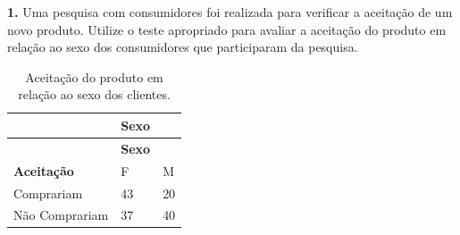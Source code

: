 \documentclass[12pt,brazil,oneside]{book}
\begin{document}
\textbf{1.} Uma pesquisa com consumidores foi realizada para verificar a aceitação de um novo produto. Utilize o teste apropriado para avaliar a aceitação do produto em relação ao sexo dos consumidores que participaram da pesquisa.

\begin{longtable}[]{@{}lll@{}}
\caption{\label{tab:exercqui} Aceitação do produto em relação ao sexo dos clientes.}\tabularnewline
\toprule
\begin{minipage}[b]{0.35\columnwidth}\raggedright
\strut
\end{minipage} & \begin{minipage}[b]{0.25\columnwidth}\raggedright
\textbf{Sexo}\strut
\end{minipage} & \begin{minipage}[b]{0.25\columnwidth}\raggedright
\strut
\end{minipage}\tabularnewline
\midrule
\endfirsthead
\toprule
\begin{minipage}[b]{0.35\columnwidth}\raggedright
\strut
\end{minipage} & \begin{minipage}[b]{0.25\columnwidth}\raggedright
\textbf{Sexo}\strut
\end{minipage} & \begin{minipage}[b]{0.25\columnwidth}\raggedright
\strut
\end{minipage}\tabularnewline
\midrule
\endhead
\begin{minipage}[t]{0.35\columnwidth}\raggedright
\textbf{Aceitação }\strut
\end{minipage} & \begin{minipage}[t]{0.25\columnwidth}\raggedright
F\strut
\end{minipage} & \begin{minipage}[t]{0.25\columnwidth}\raggedright
M\strut
\end{minipage}\tabularnewline
\begin{minipage}[t]{0.35\columnwidth}\raggedright
Comprariam\strut
\end{minipage} & \begin{minipage}[t]{0.25\columnwidth}\raggedright
43\strut
\end{minipage} & \begin{minipage}[t]{0.25\columnwidth}\raggedright
20\strut
\end{minipage}\tabularnewline
\begin{minipage}[t]{0.35\columnwidth}\raggedright
Não Comprariam\strut
\end{minipage} & \begin{minipage}[t]{0.25\columnwidth}\raggedright
37\strut
\end{minipage} & \begin{minipage}[t]{0.25\columnwidth}\raggedright
40\strut
\end{minipage}\tabularnewline
\bottomrule
\end{longtable}
\end{document}
